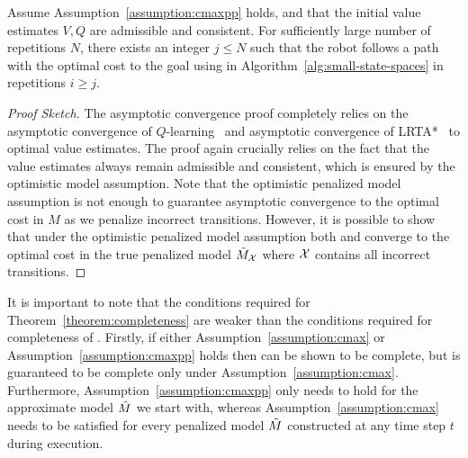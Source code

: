 \begin{theorem}
	Assume Assumption~\ref{assumption:cmaxpp} holds, and that the
        initial value estimates $V, Q$ are admissible and
        consistent. For sufficiently large number of repetitions $N$,
        there exists an integer $j \leq N$ such that the robot follows
        a path with the optimal cost to the goal using \cmaxpp{} in
        Algorithm~\ref{alg:small-state-spaces} in repetitions $i \geq
        j$.        
	\label{theorem:convergence}
\end{theorem}
\begin{proof}[Proof Sketch]
	The asymptotic convergence proof completely relies on the asymptotic
convergence of $Q$-learning~\cite{DBLP:conf/aaai/KoenigS93} and
asymptotic convergence of LRTA*~\cite{DBLP:journals/ai/Korf90} to
optimal value estimates. The proof again crucially relies on the fact
that the value estimates always remain admissible and consistent,
which is ensured by the optimistic model assumption. Note that the
optimistic penalized model assumption is not enough to guarantee
asymptotic convergence to the optimal cost in $M$ as we penalize
incorrect transitions. However, it is possible to show that under the
optimistic penalized model assumption both \cmaxpp{} and \acmaxpp{}
converge to the optimal cost in the true penalized model
$\tilde{M}_{\mathcal{X}}$ where $\mathcal{X}$ contains all incorrect
transitions.
        \end{proof}

It is important to note that
the conditions required for Theorem~\ref{theorem:completeness}
are weaker than the conditions required for completeness of
\cmax{}. Firstly,
if either Assumption~\ref{assumption:cmax} or
Assumption~\ref{assumption:cmaxpp} holds then \cmaxpp{} can be shown
to be complete, but \cmax{} is guaranteed to be complete only under
Assumption~\ref{assumption:cmax}.
Furthermore,
Assumption~\ref{assumption:cmaxpp} only needs to hold
for the approximate model $\hat{M}$ we start with, whereas
Assumption~\ref{assumption:cmax} needs to be satisfied for every penalized model $\tilde{M}$ constructed at any time
step $t$ during execution.



